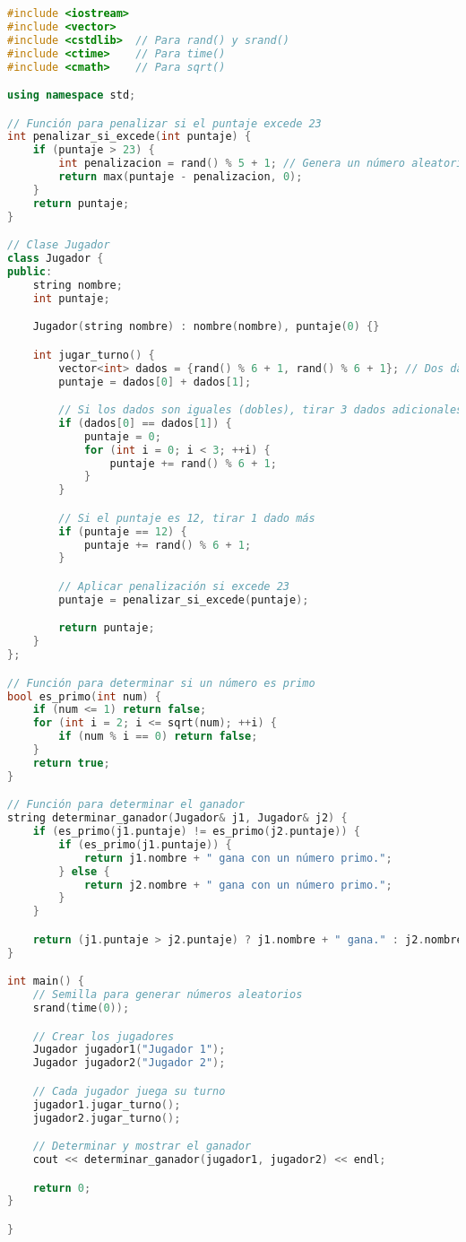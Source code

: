 \documentclass{article}
\begin{document}
\begin{lstlisting}[language=C++, caption=Código en C++]
#include <iostream>
#include <vector>
#include <cstdlib>  // Para rand() y srand()
#include <ctime>    // Para time()
#include <cmath>    // Para sqrt()

using namespace std;

// Función para penalizar si el puntaje excede 23
int penalizar_si_excede(int puntaje) {
    if (puntaje > 23) {
        int penalizacion = rand() % 5 + 1; // Genera un número aleatorio entre 1 y 5
        return max(puntaje - penalizacion, 0);
    }
    return puntaje;
}

// Clase Jugador
class Jugador {
public:
    string nombre;
    int puntaje;

    Jugador(string nombre) : nombre(nombre), puntaje(0) {}

    int jugar_turno() {
        vector<int> dados = {rand() % 6 + 1, rand() % 6 + 1}; // Dos dados de 1 a 6
        puntaje = dados[0] + dados[1];

        // Si los dados son iguales (dobles), tirar 3 dados adicionales
        if (dados[0] == dados[1]) {
            puntaje = 0;
            for (int i = 0; i < 3; ++i) {
                puntaje += rand() % 6 + 1;
            }
        }

        // Si el puntaje es 12, tirar 1 dado más
        if (puntaje == 12) {
            puntaje += rand() % 6 + 1;
        }

        // Aplicar penalización si excede 23
        puntaje = penalizar_si_excede(puntaje);

        return puntaje;
    }
};

// Función para determinar si un número es primo
bool es_primo(int num) {
    if (num <= 1) return false;
    for (int i = 2; i <= sqrt(num); ++i) {
        if (num % i == 0) return false;
    }
    return true;
}

// Función para determinar el ganador
string determinar_ganador(Jugador& j1, Jugador& j2) {
    if (es_primo(j1.puntaje) != es_primo(j2.puntaje)) {
        if (es_primo(j1.puntaje)) {
            return j1.nombre + " gana con un número primo.";
        } else {
            return j2.nombre + " gana con un número primo.";
        }
    }

    return (j1.puntaje > j2.puntaje) ? j1.nombre + " gana." : j2.nombre + " gana.";
}

int main() {
    // Semilla para generar números aleatorios
    srand(time(0));

    // Crear los jugadores
    Jugador jugador1("Jugador 1");
    Jugador jugador2("Jugador 2");

    // Cada jugador juega su turno
    jugador1.jugar_turno();
    jugador2.jugar_turno();

    // Determinar y mostrar el ganador
    cout << determinar_ganador(jugador1, jugador2) << endl;

    return 0;
}

}
\end{lstlisting}
\end{document}

